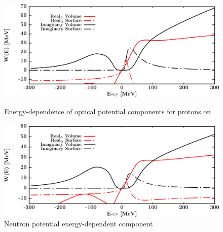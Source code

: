 \begin{figure}[H]
    \centering
    \begin{minipage}{0.45\textwidth}
        \centering
        \includegraphics[width=1.0\textwidth]{figures/pb208_protonPotentials.png}
        \caption{Energy-dependence of optical potential components for protons
        on \pbEight}
        \label{DOMFitData_pb208_proton_potentialComponent_energy}
    \end{minipage}\hfill
    \begin{minipage}{0.45\textwidth}
        \centering
        \includegraphics[width=1.0\textwidth]{figures/pb208_neutronPotentials.png}
        \caption{Neutron potential energy-dependent component}
        \label{DOMFitData_pb208_neutron_potentialComponent_energy}
    \end{minipage}
\end{figure}

